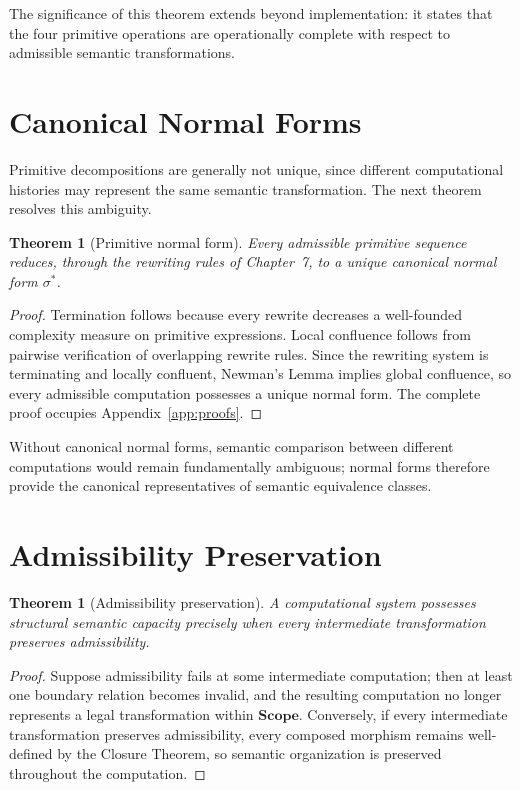\documentclass[11pt,twoside,openright]{book}
\numberwithin{equation}{chapter}
\theoremstyle{definition}
\theoremstyle{plain}
\newtheorem{theorem}[definition]{Theorem}
\theoremstyle{remark}
\theoremstyle{definition}
\newcommand{\CatScope}{\mathbf{Scope}}
\newcommand{\ScopeMorph}{\sigma}
\begin{document}
The significance of this theorem extends beyond implementation: it states
that the four primitive operations are operationally complete with
respect to admissible semantic transformations.

\section{Canonical Normal Forms}

Primitive decompositions are generally not unique, since different
computational histories may represent the same semantic transformation.
The next theorem resolves this ambiguity.

\begin{theorem}[Primitive normal form]
\label{thm:normal}
Every admissible primitive sequence reduces, through the rewriting rules
of Chapter~7, to a unique canonical normal form $\ScopeMorph^*$.
\end{theorem}

\begin{proof}
Termination follows because every rewrite decreases a well-founded
complexity measure on primitive expressions. Local confluence follows
from pairwise verification of overlapping rewrite rules. Since the
rewriting system is terminating and locally confluent, Newman's Lemma
implies global confluence, so every admissible computation possesses a
unique normal form. The complete proof occupies Appendix~\ref{app:proofs}.
\end{proof}

Without canonical normal forms, semantic comparison between different
computations would remain fundamentally ambiguous; normal forms therefore
provide the canonical representatives of semantic equivalence classes.

\section{Admissibility Preservation}

\begin{theorem}[Admissibility preservation]
\label{thm:admissibility}
A computational system possesses structural semantic capacity precisely
when every intermediate transformation preserves admissibility.
\end{theorem}

\begin{proof}
Suppose admissibility fails at some intermediate computation; then at
least one boundary relation becomes invalid, and the resulting
computation no longer represents a legal transformation within $\CatScope$.
Conversely, if every intermediate transformation preserves admissibility,
every composed morphism remains well-defined by the Closure Theorem, so
semantic organization is preserved throughout the computation.
\end{proof}
\end{document}
